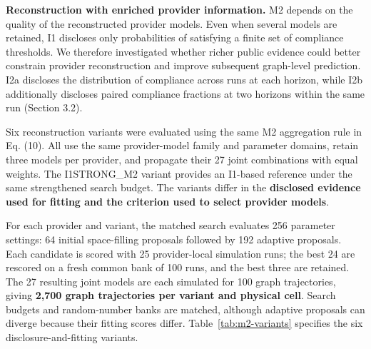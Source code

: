 \documentclass[10pt,a4paper]{article}
\begin{document}
\textbf{Reconstruction with enriched provider information.} M2 depends on the quality of the reconstructed provider models. Even when several models are retained, I1 discloses only probabilities of satisfying a finite set of compliance thresholds. We therefore investigated whether richer public evidence could better constrain provider reconstruction and improve subsequent graph-level prediction. I2a discloses the distribution of compliance across runs at each horizon, while I2b additionally discloses paired compliance fractions at two horizons within the same run (Section 3.2).

Six reconstruction variants were evaluated using the same M2 aggregation rule in Eq. (10). All use the same provider-model family and parameter domains, retain three models per provider, and propagate their 27 joint combinations with equal weights. The I1STRONG\_M2 variant provides an I1-based reference under the same strengthened search budget. The variants differ in the \textbf{disclosed evidence used for fitting and the criterion used to select provider models}.

For each provider and variant, the matched search evaluates 256 parameter settings: 64 initial space-filling proposals followed by 192 adaptive proposals. Each candidate is scored with 25 provider-local simulation runs; the best 24 are rescored on a fresh common bank of 100 runs, and the best three are retained. The 27 resulting joint models are each simulated for 100 graph trajectories, giving \textbf{2,700 graph trajectories per variant and physical cell}. Search budgets and random-number banks are matched, although adaptive proposals can diverge because their fitting scores differ. Table~\ref{tab:m2-variants} specifies the six disclosure-and-fitting variants.
\end{document}
